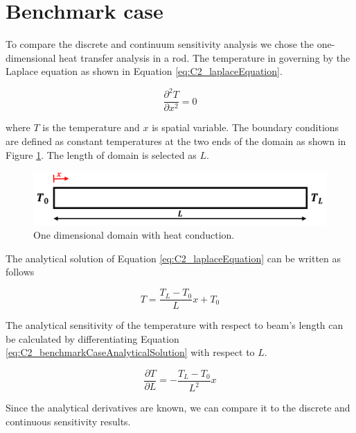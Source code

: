 \section{Benchmark case}
To compare the discrete and continuum sensitivity analysis we chose the one-dimensional heat transfer analysis in a rod. The temperature in governing by the Laplace equation as shown in Equation \eqref{eq:C2_laplaceEquation}.

\begin{equation}\label{eq:C2_laplaceEquation}
	\frac{\partial^2 T}{\partial x^2} = 0
\end{equation}

where $T$ is the temperature and $x$ is spatial variable. The boundary conditions are defined as constant temperatures at the two ends of the domain as shown in Figure \ref{fig:C2_benchmarkCase}. The length of domain is selected as $L$.

\begin{figure}
	\centering
	\includegraphics[width=14.00cm]{Chapter_2/figure/benchmark_case.png}
	\caption{One dimensional domain with heat conduction.}
	\label{fig:C2_benchmarkCase}
\end{figure}

The analytical solution of Equation \eqref{eq:C2_laplaceEquation} can be written as follows

\begin{equation}\label{eq:C2_benchmarkCaseAnalyticalSolution}
	T = \frac{T_L - T_0}{L} x + T_0
\end{equation}

The analytical sensitivity of the temperature with respect to beam's length can be calculated by differentiating Equation \eqref{eq:C2_benchmarkCaseAnalyticalSolution} with respect to $L$.

\begin{equation}
	\frac{\partial T}{\partial L} = -\frac{T_L - T_0}{L^2} x
\end{equation}

Since the analytical derivatives are known, we can compare it to the discrete and continuous sensitivity results.

